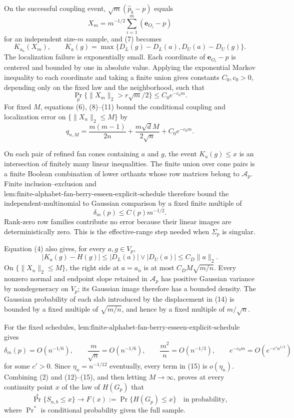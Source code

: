 On the successful coupling event, \(\sqrt m(\widehat p_b-p)\) equals
\[
X_m=m^{-1/2}\sum_{i=1}^m(\mathbf e_{O_i}-p)
\]
for an independent size-\(m\) sample, and (7) becomes
\[
K_{a_n}(X_m),
\qquad
K_a(g)=\max\{D_L(g)-D_L(a),D_U(a)-D_U(g)\}.
\tag{10}
\]
The localization failure is exponentially small.  Each coordinate of \(\mathbf e_{O_i}-p\) is centered and bounded by one in absolute value.  Applying the exponential Markov inequality to each coordinate and taking a finite union gives constants \(C_0,c_0>0\), depending only on the fixed law and the neighborhood, such that
\[
\Pr_p\{\|X_m\|_2>r\sqrt m/2\}\leq C_0e^{-c_0m}.
\tag{11}
\]
For fixed \(M\), equations (6), (8)--(11) bound the conditional coupling and localization error on \(\{\|X_n\|_2\leq M\}\) by
\[
q_{n,M}=\frac{m(m-1)}{2n}
+\frac{m\sqrt d M}{2\sqrt n}+C_0e^{-c_0m}.
\tag{12}
\]

On each pair of refined fan cones containing \(a\) and \(g\), the event \(K_a(g)\leq x\) is an intersection of finitely many linear inequalities.  The finite union over cone pairs is a finite Boolean combination of lower orthants whose row matrices belong to \(\mathcal A_p\).  Finite inclusion--exclusion and \(\text{lem:finite-alphabet-fan-berry-esseen-explicit-schedule}\) therefore bound the independent-multinomial to Gaussian comparison by a fixed finite multiple of
\[
\delta_m(p)\leq C(p)m^{-1/2}.
\tag{13}
\]
Rank-zero row families contribute no error because their linear images are deterministically zero.  This is the effective-range step needed when \(\Sigma_p\) is singular.

Equation (4) also gives, for every \(a,g\in V_p\),
\[
|K_a(g)-H(g)|
\leq |D_L(a)|\vee|D_U(a)|
\leq C_D\|a\|_2.
\tag{14}
\]
On \(\{\|X_n\|_2\leq M\}\), the right side at \(a=a_n\) is at most \(C_DM\sqrt{m/n}\).  Every nonzero normal and endpoint slope retained in \(\mathcal A_p\) has positive Gaussian variance by nondegeneracy on \(V_p\); its Gaussian image therefore has a bounded density.  The Gaussian probability of each slab introduced by the displacement in (14) is bounded by a fixed multiple of \(\sqrt{m/n}\), and hence by a fixed multiple of \(m/\sqrt n\).

For the fixed schedules, \(\text{lem:finite-alphabet-fan-berry-esseen-explicit-schedule}\) gives
\[
\delta_m(p)=O(n^{-1/6}),
\qquad
\frac m{\sqrt n}=O(n^{-1/6}),
\qquad
\frac{m^2}{n}=O(n^{-1/3}),
\qquad
e^{-c_0m}=O(e^{-c'n^{1/3}})
\tag{15}
\]
for some \(c'>0\).  Since \(\eta_n=n^{-1/12}\) eventually, every term in (15) is \(o(\eta_n)\).  Combining (2) and (12)--(15), and then letting \(M\to\infty\), proves at every continuity point \(x\) of the law of \(H(G_p)\) that
\[
\Pr^*\{S_{n,b}\leq x\}\longrightarrow
F(x):=\Pr\{H(G_p)\leq x\}
\quad\text{in probability},
\tag{16}
\]
where \(\Pr^*\) is conditional probability given the full sample.

